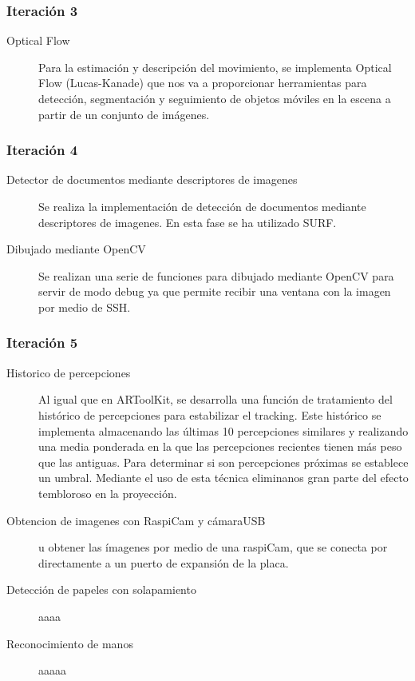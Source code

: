 \subsubsection{Iteración 3}
\begin{description}
\item [Optical Flow] Para la estimación y descripción del movimiento, se implementa Optical Flow  (Lucas-Kanade) que nos va a proporcionar herramientas para detección, segmentación y seguimiento de  objetos móviles en la escena a partir de un conjunto de imágenes. 

\end{description}
\subsubsection{Iteración 4}
\begin{description}
\item [Detector de documentos mediante descriptores de imagenes] Se realiza la implementación de detección de documentos mediante descriptores de imagenes. En esta fase se ha utilizado SURF.
\item [Dibujado mediante OpenCV] Se realizan una serie de funciones para dibujado mediante OpenCV para servir de modo debug ya que permite recibir una ventana con la imagen por medio de SSH.
\end{description}

\subsubsection{Iteración 5}
\begin{description}
\item [Historico de percepciones] Al igual que en ARToolKit, se desarrolla una función de tratamiento del histórico de percepciones para estabilizar el tracking. Este histórico se implementa  almacenando las últimas 10 percepciones similares y realizando una media ponderada en la que las percepciones recientes tienen más peso que las antiguas. Para determinar si son percepciones próximas se establece un umbral. Mediante el uso de esta técnica eliminanos gran parte del efecto tembloroso en la proyección.
\item [Obtencion de imagenes con RaspiCam y cámaraUSB] u obtener las ímagenes por medio de una raspiCam, que se conecta por directamente a un puerto de expansión de la placa.
\item [Detección de papeles con solapamiento] aaaa
\item [Reconocimiento de manos] aaaaa


\end{description}

